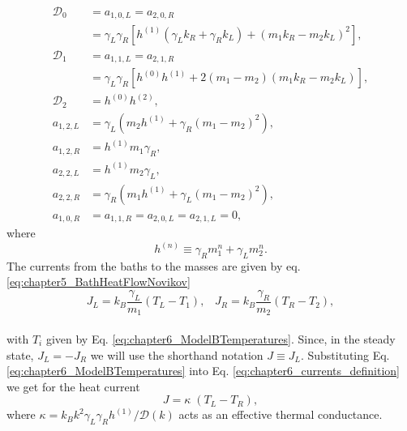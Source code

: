   \begin{align}
    \mathcal{D}_0 &= a_{1,0,L} = a_{2,0,R}
    \nonumber\\
    & = \gamma _L \gamma _R\! \left[h^{(1)}\! \left(\gamma_L k_R +\gamma_R k_L \right)+\left(m_1 k_R-m_2 k_L\right)^2\right]\!,
    \nonumber\\
    \mathcal{D}_1 &= a_{1,1,L} = a_{2,1,R}
    \nonumber\\
    &= \gamma _L \gamma _R\! \left[h^{(0)} h^{(1)}\!+2 \left(m_1-m_2\right) \left(m_1 k_R-m_2 k_L\right)\right]\!,
    \nonumber\\
    \mathcal{D}_2 &= h^{(0)} h^{(2)},\nonumber
    \\
    a_{1,2,L} &= \gamma _L \left(m_2 h^{(1)} + \gamma_R (m_1 - m_2)^2 \right),\nonumber
    \\
    a_{1,2,R} &= h^{(1)} m_1 \gamma_R,\nonumber
    \\
    a_{2,2,L} &= h^{(1)} m_2 \gamma_L,\nonumber
    \\
    a_{2,2,R} &= \gamma _R \left( m_1 h^{(1)} + \gamma_L (m_1-m_2)^2 \right),\nonumber
    \\
    a_{1,0,R} &= a_{1,1,R} = a_{2,0,L} = a_{2,1,L} = 0,
    \label{eq:chapter6_SolutionPolynomialCoefficients}
  \end{align}
%
where
%
\begin{equation}
h^{(n)}\equiv \gamma_R m_1^n + \gamma_L m_2^n.
\end{equation}
%
The currents from the baths to the masses are given by eq. \eqref{eq:chapter5_BathHeatFlowNovikov}
%
\begin{equation}
    J_L = k_B \frac{\gamma_L}{m_1} \left( T_L - T_1 \right),\;\;\;
    J_R = k_B \frac{\gamma_R}{m_2} \left( T_R - T_2 \right),
    \label{eq:chapter6_currents_definition}
\end{equation}
\\
%
with $T_i$ given by Eq. \eqref{eq:chapter6_ModelBTemperatures}. Since, in the steady state, $J_L = -J_R$ we will use the shorthand notation $J \equiv J_L$. Substituting Eq. \eqref{eq:chapter6_ModelBTemperatures} into Eq.  \eqref{eq:chapter6_currents_definition} we get for the heat current
%
\begin{equation}
  J = \kappa\;(T_L - T_R),
  \label{eq:chapter6_CurrentsInModelB}
\end{equation}
%
where $\kappa = k_B {k^2\gamma_L \gamma_R h^{(1)}}/{\mathcal{D}(k)}$ acts as an effective thermal conductance.
%
%
%
%
